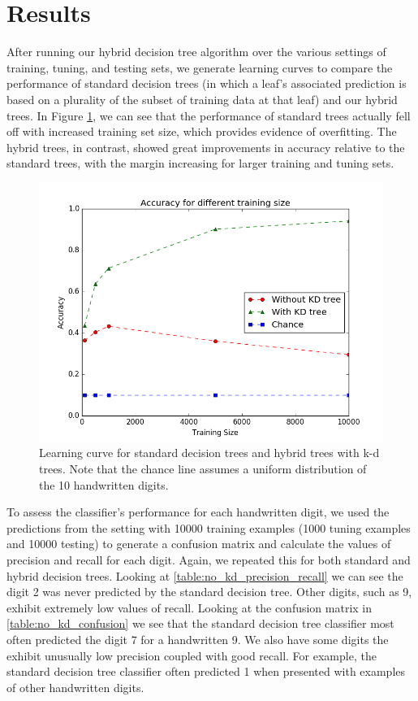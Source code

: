 \section{Results}
After running our hybrid decision tree algorithm over the various settings of training, tuning, and testing sets, we generate learning curves to compare the performance of standard decision trees (in which a leaf's associated prediction is based on a plurality of the subset of training data at that leaf) and our hybrid trees.  In Figure \ref{fig:learn_curve}, we can see that the performance of standard trees actually fell off with increased training set size, which provides evidence of overfitting. The hybrid trees, in contrast, showed great improvements in accuracy relative to the standard trees, with the margin increasing for larger training and tuning sets.

\begin{figure}
	\includegraphics[width=\linewidth]{Figures/learning_curve.png}
	\caption{Learning curve for standard decision trees and hybrid trees with k-d trees.  Note that the chance line assumes a uniform distribution of the 10 handwritten digits.}
	\label{fig:learn_curve}
\end{figure}

To assess the classifier's performance for each handwritten digit, we used the predictions from the setting with 10000 training examples (1000 tuning examples and 10000 testing) to generate a confusion matrix and calculate the values of precision and recall for each digit.  Again, we repeated this for both standard and hybrid decision trees.  Looking at \ref{table:no_kd_precision_recall} we can see the digit 2 was never predicted by the standard decision tree.  Other digits, such as 9, exhibit extremely low values of recall. Looking at the confusion matrix in \ref{table:no_kd_confusion} we see that the standard decision tree classifier most often predicted the digit 7 for a handwritten 9.  We also have some digits the exhibit unusually low precision coupled with good recall.  For example, the standard decision tree classifier often predicted 1 when presented with examples of other handwritten digits.

